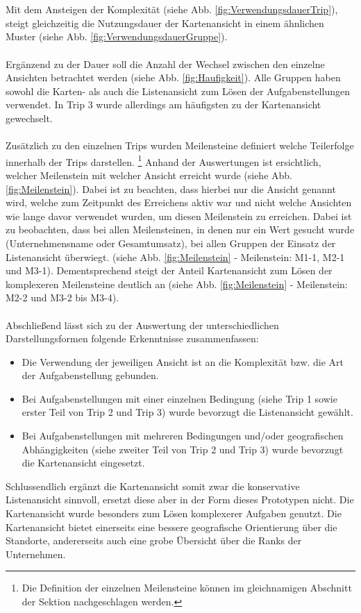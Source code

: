 \documentclass[Bachelorarbeit.tex]{subfiles}
\begin{document}
\\
\\
Mit dem Ansteigen der Komplexität (siehe Abb. \ref{fig:VerwendungsdauerTrip}), steigt gleichzeitig die Nutzungsdauer der Kartenansicht in einem ähnlichen Muster (siehe Abb. \ref{fig:VerwendungsdauerGruppe}).
\\
\\
Ergänzend zu der Dauer soll die Anzahl der Wechsel zwischen den einzelne Ansichten betrachtet werden (siehe Abb. \ref{fig:Haufigkeit}).
Alle Gruppen haben sowohl die Karten- als auch die Listenansicht zum Lösen der Aufgabenstellungen verwendet. 
In Trip 3 wurde allerdings am häufigsten zu der Kartenansicht gewechselt. \\
\\
Zusätzlich zu den einzelnen Trips wurden Meilensteine definiert welche Teilerfolge innerhalb der Trips darstellen.
\footnote{
	Die Definition der einzelnen Meilensteine können im gleichnamigen Abschnitt der Sektion  nachgeschlagen werden.
	}
Anhand der Auswertungen ist ersichtlich, welcher Meilenstein mit welcher Ansicht erreicht wurde (siehe Abb. \ref{fig:Meilenstein}). 
Dabei ist zu beachten, dass hierbei nur die Ansicht genannt wird, welche zum Zeitpunkt des Erreichens aktiv war und nicht welche Ansichten wie lange davor verwendet wurden, um diesen Meilenstein zu erreichen.
Dabei ist zu beobachten, dass bei allen Meilensteinen, in denen nur ein Wert gesucht wurde (Unternehmensname oder Gesamtumsatz), bei allen Gruppen der Einsatz der Listenansicht überwiegt. (siehe Abb. \ref{fig:Meilenstein} - Meilenstein: M1-1, M2-1 und M3-1).
Dementsprechend steigt der Anteil Kartenansicht zum Lösen der komplexeren Meilensteine deutlich an (siehe Abb. \ref{fig:Meilenstein} - Meilenstein:  M2-2 und M3-2 bis M3-4).  \\
\\
Abschließend lässt sich zu der Auswertung der unterschiedlichen Darstellungsformen folgende Erkenntnisse zusammenfassen: 
\begin{itemize}
	\item[] Die Verwendung der jeweiligen Ansicht ist an die Komplexität bzw. die Art der  Aufgabenstellung gebunden.
	\item[] Bei Aufgabenstellungen mit einer einzelnen Bedingung (siehe Trip 1 sowie erster Teil von Trip 2 und Trip 3) wurde bevorzugt die Listenansicht gewählt.
	\item[] Bei Aufgabenstellungen mit mehreren Bedingungen und/oder geografischen Abhängigkeiten (siehe zweiter Teil von Trip 2 und Trip 3) wurde bevorzugt die Kartenansicht eingesetzt. 
\end{itemize}

Schlussendlich ergänzt die Kartenansicht somit zwar die konservative Listenansicht sinnvoll, ersetzt diese aber in der Form dieses Prototypen nicht. Die Kartenansicht wurde besonders zum Lösen komplexerer Aufgaben genutzt. Die Kartenansicht bietet einerseits eine bessere geografische Orientierung über die Standorte, andererseits auch eine grobe Übersicht über die Ranks der Unternehmen.
\end{document}

